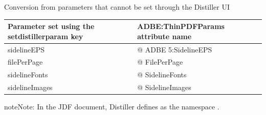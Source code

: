 \documentclass[letterpaper,12pt,english,openany,oneside]{sphinxmanual}
\begin{document}
Conversion from parameters that cannot be set through the Distiller UI


\begin{savenotes}\sphinxattablestart
\centering
{}\label{\detokenize{PDF_Create_JDF:section-12}}\nobreak
\begin{tabulary}{\linewidth}[t]{|T|T|}
\hline
\sphinxstyletheadfamily 
Parameter set using the setdistillerparam key
&\sphinxstyletheadfamily 
ADBE:ThinPDFParams attribute name
\\
\hline
sidelineEPS
&
@ ADBE 5:SidelineEPS
\\
\hline
filePerPage
&
@ FilePerPage
\\
\hline
sidelineFonts
&
@ SidelineFonts
\\
\hline
sidelineImages
&
@ SidelineImages
\\
\hline
\end{tabulary}
\par
\sphinxattableend\end{savenotes}

\begin{sphinxadmonition}{note}{Note:}
In the JDF document, Distiller defines  as the namespace  .
\end{sphinxadmonition}



\renewcommand{\indexname}{Index}
\printindex
\end{document}
